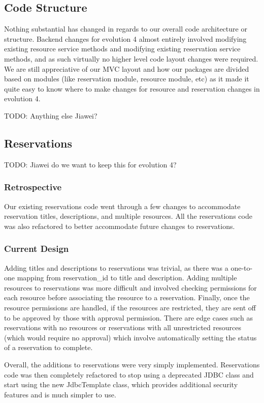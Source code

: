 \documentclass[12pt]{article}
\begin{document}
\subsection{Code Structure}
Nothing substantial has changed in regards to our overall code architecture or structure. Backend changes for evolution 4 almost entirely involved modifying existing resource service methods and modifying existing reservation service methods, and as such virtually no higher level code layout changes were required. We are still appreciative of our MVC layout and how our packages are divided based on modules (like reservation module, resource module, etc) as it made it quite easy to know where to make changes for resource and reservation changes in evolution 4. 

TODO: Anything else Jiawei?


\subsection{Reservations}
TODO: Jiawei do we want to keep this for evolution 4? 
\subsubsection{Retrospective}
Our existing reservations code went through a few changes to accommodate reservation titles, descriptions, and multiple resources. All the reservations code was also refactored to better accommodate future changes to reservations. 

\subsubsection{Current Design}
Adding titles and descriptions to reservations was trivial, as there was a one-to-one mapping from reservation\_id to title and description. Adding multiple resources to reservations was more difficult and involved checking permissions for each resource before associating the resource to a reservation. Finally, once the resource permissions are handled, if the resources are restricted, they are sent off to be approved by those with approval permission. There are edge cases such as reservations with no resources or reservations with all unrestricted resources (which would require no approval) which involve automatically setting the status of a reservation to complete. 

Overall, the additions to reservations were very simply implemented. Reservations code was then completely refactored to stop using a deprecated JDBC class and start using the new JdbcTemplate class, which provides additional security features and is much simpler to use. 
\end{document}
